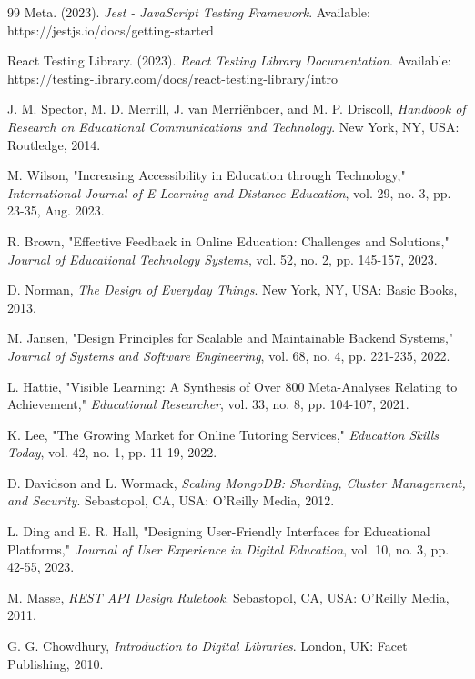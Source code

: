 \documentclass[12pt,a4paper]{report}
\begin{document}
\begin{thebibliography}{99}
Meta. (2023). \textit{Jest - JavaScript Testing Framework}. 
Available: https://jestjs.io/docs/getting-started

React Testing Library. (2023). \textit{React Testing Library Documentation}. 
Available: https://testing-library.com/docs/react-testing-library/intro

J. M. Spector, M. D. Merrill, J. van Merriënboer, and M. P. Driscoll, 
\textit{Handbook of Research on Educational Communications and Technology}. 
New York, NY, USA: Routledge, 2014.

M. Wilson, "Increasing Accessibility in Education through Technology," 
\textit{International Journal of E-Learning and Distance Education}, 
vol. 29, no. 3, pp. 23-35, Aug. 2023.

R. Brown, "Effective Feedback in Online Education: Challenges and Solutions," 
\textit{Journal of Educational Technology Systems}, 
vol. 52, no. 2, pp. 145-157, 2023.

D. Norman, \textit{The Design of Everyday Things}. 
New York, NY, USA: Basic Books, 2013.

M. Jansen, "Design Principles for Scalable and Maintainable Backend Systems," 
\textit{Journal of Systems and Software Engineering}, 
vol. 68, no. 4, pp. 221-235, 2022.

L. Hattie, "Visible Learning: A Synthesis of Over 800 Meta-Analyses Relating to Achievement," 
\textit{Educational Researcher}, 
vol. 33, no. 8, pp. 104-107, 2021.

K. Lee, "The Growing Market for Online Tutoring Services," 
\textit{Education Skills Today}, 
vol. 42, no. 1, pp. 11-19, 2022.

D. Davidson and L. Wormack, \textit{Scaling MongoDB: Sharding, Cluster Management, and Security}. 
Sebastopol, CA, USA: O'Reilly Media, 2012.

L. Ding and E. R. Hall, "Designing User-Friendly Interfaces for Educational Platforms," 
\textit{Journal of User Experience in Digital Education}, 
vol. 10, no. 3, pp. 42-55, 2023.

M. Masse, \textit{REST API Design Rulebook}. 
Sebastopol, CA, USA: O'Reilly Media, 2011.

G. G. Chowdhury, \textit{Introduction to Digital Libraries}. 
London, UK: Facet Publishing, 2010.


\end{thebibliography}
\end{document}
